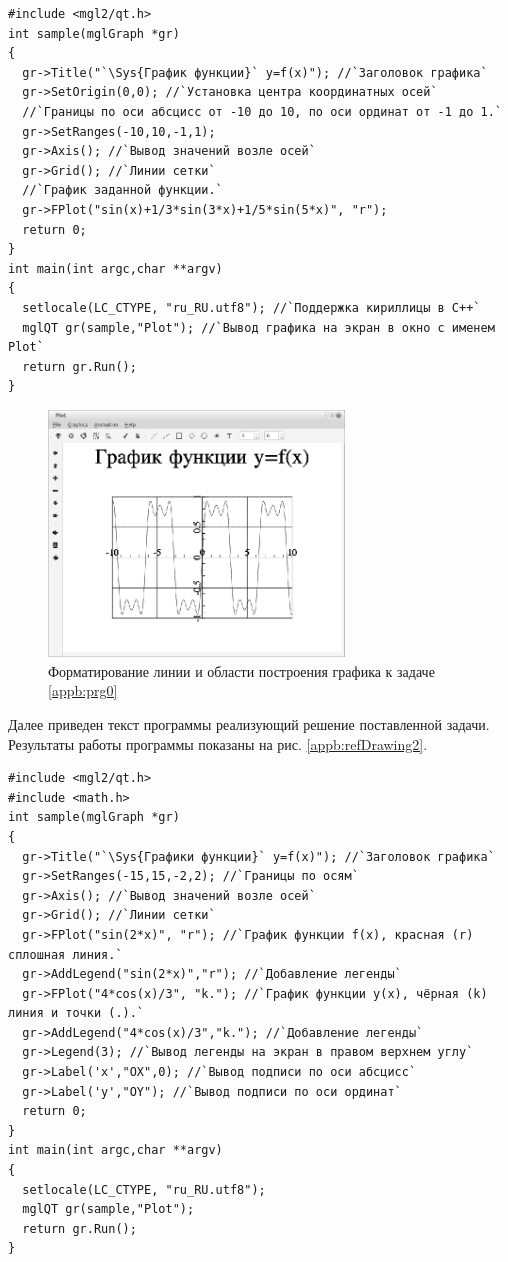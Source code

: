 \begin{lstlisting}
#include <mgl2/qt.h>
int sample(mglGraph *gr)
{
  gr->Title("`\Sys{График функции}` y=f(x)"); //`Заголовок графика`
  gr->SetOrigin(0,0); //`Установка центра координатных осей`
  //`Границы по оси абсцисс от -10 до 10, по оси ординат от -1 до 1.`
  gr->SetRanges(-10,10,-1,1);
  gr->Axis(); //`Вывод значений возле осей`
  gr->Grid(); //`Линии сетки`
  //`График заданной функции.`
  gr->FPlot("sin(x)+1/3*sin(3*x)+1/5*sin(5*x)", "r");
  return 0;
}
int main(int argc,char **argv)
{
  setlocale(LC_CTYPE, "ru_RU.utf8"); //`Поддержка кириллицы в С++`
  mglQT gr(sample,"Plot"); //`Вывод графика на экран в окно с именем Plot`
  return gr.Run();
}
\end{lstlisting}

\begin{figure}[htb]
\begin{center}
\includegraphics[width=0.7\textwidth]{img/ris_appb_2}
\caption{Форматирование линии и области построения графика к задаче \ref{appb:prg0}}
\label{appb:refDrawing1}
\end{center}
\end{figure}


Далее приведен текст программы реализующий решение поставленной задачи. Результаты работы программы показаны на рис.
\ref{appb:refDrawing2}.
\begin{lstlisting}
#include <mgl2/qt.h>
#include <math.h>
int sample(mglGraph *gr)
{  
  gr->Title("`\Sys{Графики функции}` y=f(x)"); //`Заголовок графика`
  gr->SetRanges(-15,15,-2,2); //`Границы по осям`
  gr->Axis(); //`Вывод значений возле осей`
  gr->Grid(); //`Линии сетки`
  gr->FPlot("sin(2*x)", "r"); //`График функции f(x), красная (r) сплошная линия.`
  gr->AddLegend("sin(2*x)","r"); //`Добавление легенды`
  gr->FPlot("4*cos(x)/3", "k."); //`График функции y(x), чёрная (k) линия и точки (.).`
  gr->AddLegend("4*cos(x)/3","k."); //`Добавление легенды`
  gr->Legend(3); //`Вывод легенды на экран в правом верхнем углу`
  gr->Label('x',"OX",0); //`Вывод подписи по оси абсцисс`
  gr->Label('y',"OY"); //`Вывод подписи по оси ординат`
  return 0;
}
int main(int argc,char **argv)
{
  setlocale(LC_CTYPE, "ru_RU.utf8");
  mglQT gr(sample,"Plot");
  return gr.Run();
}
\end{lstlisting}

